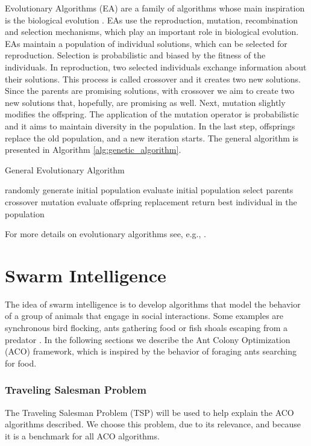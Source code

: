 			Evolutionary Algorithms (EA) are a family of algorithms whose main inspiration is the biological evolution \cite{eiben03}. EAs use the reproduction, mutation, recombination and selection mechanisms, which play an important role in biological evolution.	
			EAs maintain a population of individual solutions, which can be selected for reproduction. Selection is probabilistic and biased by the fitness of the individuals. In reproduction, two selected individuals exchange information about their solutions. This process is called crossover and it creates two new solutions. Since the parents are promising solutions, with crossover we aim to create two new solutions that, hopefully, are promising as well. 
			Next, mutation slightly modifies the offspring. The application of the mutation operator is probabilistic and it aims to maintain diversity in the population.
			In the last step, offsprings replace the old population, and a new iteration starts.
			The general algorithm is presented in Algorithm \ref{alg:genetic_algorithm}.
			\begin{algorithm}
				\caption{General Evolutionary Algorithm}
				\label{alg:genetic_algorithm}
				\begin{algorithmic}
				\STATE randomly generate initial population
				\STATE evaluate initial population
					\STATE select parents
					\STATE crossover
					\STATE mutation
					\STATE evaluate offspring
					\STATE replacement
				\ENDWHILE
				\STATE return best individual in the population
				\end{algorithmic}
			\end{algorithm} 
			
			For more details on evolutionary algorithms see, e.g., \cite{eiben03}.
			
		\section{Swarm Intelligence}
		\label{subsec:swarm_intelligence}
		The idea of swarm intelligence is to develop algorithms that model the behavior of a group of animals that engage in social interactions. Some examples are synchronous bird flocking, ants gathering food or fish shoals escaping from a predator \cite{si01}. In the following sections we describe the Ant Colony Optimization (ACO) framework, which is inspired by the behavior of foraging ants searching for food.
		
		\subsubsection*{Traveling Salesman Problem}
		 The Traveling Salesman Problem (TSP) will be used to help explain the ACO algorithms described. We choose this problem, due to its relevance, and because it is a benchmark for all ACO algorithms.
		
